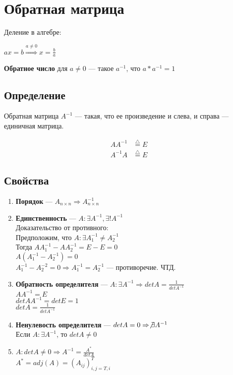 \documentclass{article}
\begin{document}
\pagebreak
\section{Обратная матрица}

Деление в алгебре:

$ax = b \stackrel{a \ne 0}{\Rightarrow} x = \frac{b}{a}$

\textbf{Обратное число} для $a \ne 0$ --- такое $a^{-1}$, что $a * a^{-1} = 1$

\subsection{Определение}

Обратная матрица $A^{-1}$ --- такая, что ее произведение и слева, и справа --- единичная матрица.

\begin{align*}
A A^{-1} &\stackrel{\triangle}{=} E \\
A^{-1} A &\stackrel{\triangle}{=} E
\end{align*}

\subsection{Свойства}

\begin{enumerate}
	\item \textbf{Порядок} --- $A_{n \times n} \Rightarrow A_{n \times n}^{-1}$
	\item \textbf{Единственность} --- $A : \exists A^{-1}, \exists ! A^{-1}$\\
	Доказательство от противного:\\
	Предположим, что $A : \exists A^{-1}_1 \ne A^{-1}_2$\\
	Тогда $A A_1^{-1} - A A_2^{-1} = E - E = 0$\\
	$A(A_1^{-1} - A_2^{-1}) = 0$\\
	$A_1^{-1} - A_2^{-2} = 0 \Rightarrow A_1^{-1} = A_2^{-1}$ --- противоречие. ЧТД.
	\item \textbf{Обратность определителя} --- $A : \exists A^{-1} \Rightarrow det A = \frac{1}{det A^{-1}}$\\
	$A A^{-1} = E$\\
	$det A A^{-1} = det E = 1$\\
	$det A = \frac{1}{det A^{-1}}$
	\item \textbf{Ненулевость определителя} --- $det A = 0 \Rightarrow \not \exists A^{-1}$\\
	Если $A : \exists A^{-1}$, то $det A \ne 0$
	\item $A : det A \ne 0 \Rightarrow A^{-1} = \frac{A^*}{det A}$\\
	$A^* = adj(A) = (A_{ij})_{i,j = T,i}^T$
\end{enumerate}
\end{document}
